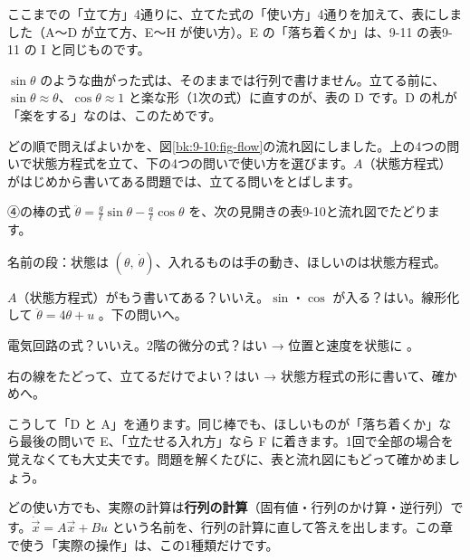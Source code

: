 
\label{bk:9-10:hyou}ここまでの「立て方」4通りに、立てた式の「使い方」4通りを加えて、表にしました（A〜D が立て方、E〜H が使い方）。E の「落ち着くか」は、9-11 の表9-11 の I と同じものです。

$\sin\theta$ のような曲がった式は、そのままでは行列で書けません。立てる前に、$\sin\theta\approx\theta$、$\cos\theta\approx1$ と楽な形（1次の式）に直すのが、表の D です。D の札が「楽をする」なのは、このためです。

どの順で問えばよいかを、図\ref{bk:9-10:fig-flow}の流れ図にしました。上の4つの問いで状態方程式を立て、下の4つの問いで使い方を選びます。$A$（状態方程式）がはじめから書いてある問題では、立てる問いをとばします。

④の棒の式 $\ddot\theta=\frac{g}{\ell}\sin\theta-\frac{a}{\ell}\cos\theta$ を、次の見開きの表9-10と流れ図でたどります。
\begin{enumerate}[label={\bkcircled[\bkTT]{\arabic*}}, leftmargin=2.4\zw, itemsep=1pt, topsep=2pt]
\item 名前の段：状態は $(\theta,\ \dot\theta)$、入れるものは手の動き、ほしいのは状態方程式。
\item $A$（状態方程式）がもう書いてある？\enspace いいえ。\enspace $\sin$・$\cos$ が入る？\enspace はい。線形化して $\ddot\theta=4\theta+u$ 。下の問いへ。
\item 電気回路の式？\enspace いいえ。\enspace 2階の微分の式？\enspace はい → 位置と速度を状態に 。
\item 右の線をたどって、立てるだけでよい？\enspace はい → 状態方程式の形に書いて、確かめへ。
\end{enumerate}
こうして「D と A」を通ります。同じ棒でも、ほしいものが「落ち着くか」なら最後の問いで E、「立たせる入れ方」なら F に着きます。1回で全部の場合を覚えなくても大丈夫です。問題を解くたびに、表と流れ図にもどって確かめましょう。

どの使い方でも、実際の計算は\textbf{行列の計算}（固有値・行列のかけ算・逆行列）です。$\dot{\vec x}=A\vec x+Bu$ という名前を、行列の計算に直して答えを出します。この章で使う「実際の操作」は、この1種類だけです。


